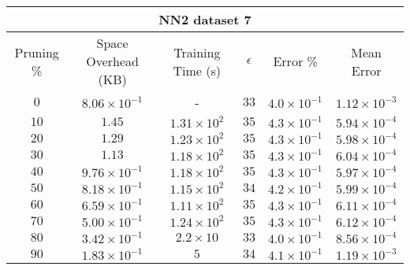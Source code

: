 \begin{adjustwidth}{0cm}{}
\begin{tabular}{cccccc}
\hline
\multicolumn{6}{c}{NN2 dataset 7} \\
\toprule
Pruning \% & Space Overhead (KB) & Training Time (s) & $\epsilon$ & Error \% & Mean Error\\
\midrule
$0$ & $8.06 \times 10^{-1}$ & - & $33$ & $4.0 \times 10^{-1}$ & $1.12 \times 10^{-3}$\\
$10$ & $1.45$ & $1.31 \times 10^{2}$ & $35$ & $4.3 \times 10^{-1}$ & $5.94 \times 10^{-4}$\\
$20$ & $1.29$ & $1.23 \times 10^{2}$ & $35$ & $4.3 \times 10^{-1}$ & $5.98 \times 10^{-4}$\\
$30$ & $1.13$ & $1.18 \times 10^{2}$ & $35$ & $4.3 \times 10^{-1}$ & $6.04 \times 10^{-4}$\\
$40$ & $9.76 \times 10^{-1}$ & $1.18 \times 10^{2}$ & $35$ & $4.3 \times 10^{-1}$ & $5.97 \times 10^{-4}$\\
$50$ & $8.18 \times 10^{-1}$ & $1.15 \times 10^{2}$ & $34$ & $4.2 \times 10^{-1}$ & $5.99 \times 10^{-4}$\\
$60$ & $6.59 \times 10^{-1}$ & $1.11 \times 10^{2}$ & $35$ & $4.3 \times 10^{-1}$ & $6.11 \times 10^{-4}$\\
$70$ & $5.00 \times 10^{-1}$ & $1.24 \times 10^{2}$ & $35$ & $4.3 \times 10^{-1}$ & $6.12 \times 10^{-4}$\\
$80$ & $3.42 \times 10^{-1}$ & $2.2 \times 10$ & $33$ & $4.0 \times 10^{-1}$ & $8.56 \times 10^{-4}$\\
$90$ & $1.83 \times 10^{-1}$ & $5$ & $34$ & $4.1 \times 10^{-1}$ & $1.19 \times 10^{-3}$\\
\bottomrule
\end{tabular}
\end{adjustwidth}

\null\par\null

